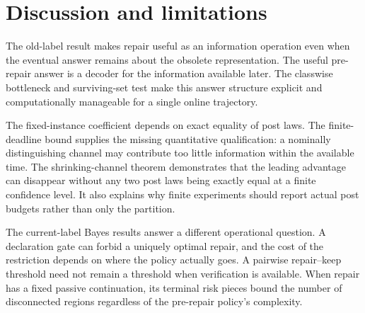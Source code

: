 \section{Discussion and limitations}
\label{sec:discussion}
The old-label result makes repair useful as an information operation even
when the eventual answer remains about the obsolete representation. The useful
pre-repair answer is a decoder for the information available later. The
classwise bottleneck and surviving-set test make this answer structure
explicit and computationally manageable for a single online trajectory.

The fixed-instance coefficient depends on exact equality of post laws.
The finite-deadline bound supplies the missing quantitative qualification:
a nominally distinguishing channel may contribute too little information
within the available time. The shrinking-channel theorem demonstrates that
the leading advantage can disappear without any two post laws being exactly
equal at a finite confidence level. It also explains why finite experiments
should report actual post budgets rather than only the partition.

The current-label Bayes results answer a different operational question.
A declaration gate can forbid a uniquely optimal repair, and the cost of the
restriction depends on where the policy actually goes. A pairwise repair--keep
threshold need not remain a threshold when verification is available.
When repair has a fixed passive continuation, its terminal risk pieces bound
the number of disconnected regions regardless of the pre-repair policy's
complexity.

